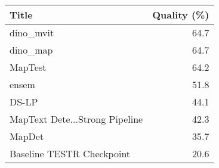 \begin{tabular}{lr}
\toprule
Title & Quality (\%) \\
\midrule
dino_mvit & 64.7 \\
dino_map & 64.7 \\
MapTest & 64.2 \\
ensem & 51.8 \\
DS-LP & 44.1 \\
MapText Dete...Strong Pipeline & 42.3 \\
MapDet & 35.7 \\
Baseline TESTR Checkpoint & 20.6 \\
\bottomrule
\end{tabular}
